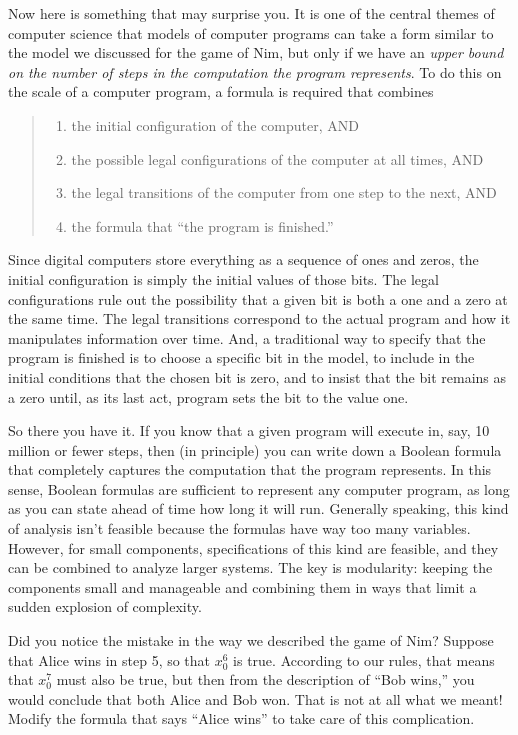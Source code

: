 {Now here is something that may surprise you.
It is one of the central themes of computer science
that models of computer programs can take a form
similar to the model we discussed for the game of Nim,
but only if we have an \emph{upper bound on the number of
steps in the computation the program represents}.
To do this on the scale of a computer program,
a formula is required that combines
\begin{quote}
\begin{enumerate}
\item the initial configuration of the computer, AND
\item the possible legal configurations of the computer at all times, AND
\item the legal transitions of the computer from one step to the next, AND
\item the formula that ``the program is finished.''
\end{enumerate}
\end{quote}

Since digital computers store everything as a sequence of ones and zeros,
the initial configuration is simply the initial values of those bits.
The legal configurations rule out the possibility that a given bit is both a
one and a zero at the same time.
The legal transitions correspond to the actual program and how it manipulates information
over time. And, a traditional way to specify that the program is finished
is to choose a specific bit in the model, to include in the initial conditions
that the chosen bit is zero, and to insist that
the bit remains as a zero until, as its last act,
program sets the bit to the value one.

So there you have it.
If you know that a given program will execute in, say, 10 million or fewer steps,
then (in principle) you can
write down a Boolean formula that completely captures the computation
that the program represents.
In this sense, Boolean formulas are sufficient to
represent any computer program,
as long as you can state ahead of time how long it will run.
Generally speaking, this kind of analysis isn't feasible
because the formulas have way too many variables.
However, for small components,
specifications of this kind are feasible, and they can be combined
to analyze larger systems. The key is modularity: keeping the
components small and manageable and combining them in
ways that limit a sudden explosion of complexity.

\begin{ExerciseList}
\Exercise
Did you notice the mistake in the way we described the game of Nim?
Suppose that Alice wins in step 5, so that $x_{0}^{6}$ is true.
According to our rules, that means that $x_{0}^{7}$ must also be true,
but then from the description of ``Bob wins,''
you would conclude that both Alice and Bob won.
That is not at all what we meant! Modify the formula that says ``Alice wins''
to take care of this complication.


\end{ExerciseList}}
